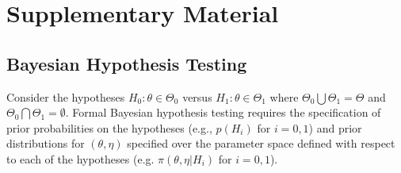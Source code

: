 \documentclass[useAMS,usenatbib,referee]{biom}
\begin{document}

\vspace*{-8pt}




\section{Supplementary Material}

\subsection{Bayesian Hypothesis Testing}\label{sec:hypothesis}
Consider the hypotheses $H_0:\theta\in\Theta_{0}$ versus $H_1:\theta\in\Theta_{1}$ where $\Theta_{0}\bigcup \Theta_{1} = \Theta$ and $\Theta_{0} \bigcap \Theta_{1} = \emptyset$.
%
Formal Bayesian hypothesis testing requires the specification of prior probabilities on the hypotheses (e.g., $p(H_i)$ for $i=0,1$)
and prior distributions for $\left(\theta,\eta\right)$ specified over the parameter space defined with respect to each of the 
hypotheses (e.g. $\pi\left(\theta,\eta \big| H_i\right)$ for $i=0,1$). 
%
\end{document}
